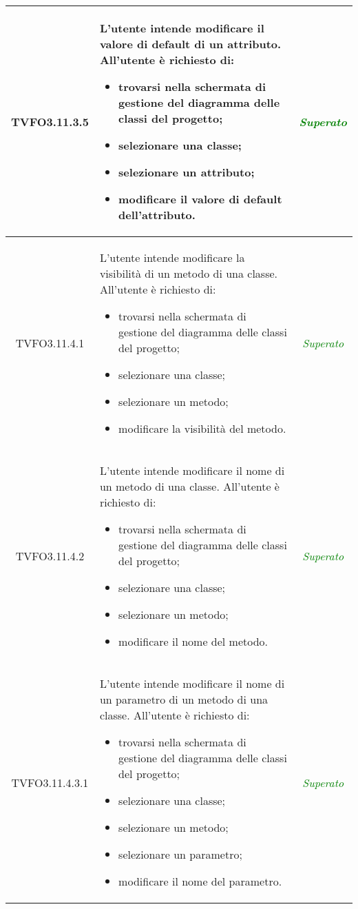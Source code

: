 \begin{longtable}{|c|>{}m{8cm}|c|}
\hypertarget{TVFO3.11.3.5}{TVFO3.11.3.5} & L'utente intende modificare il valore di default di un attributo.
All'utente è richiesto di:
\begin{itemize}
	\item trovarsi nella schermata di gestione del diagramma delle classi del progetto;
	\item selezionare una classe;
	\item selezionare un attributo;
	\item modificare il valore di default dell'attributo.
\end{itemize} & \textcolor{Green}{\textit{Superato}}\\ \hline

\hypertarget{TVFO3.11.4.1}{TVFO3.11.4.1} & L'utente intende modificare la visibilità di un metodo di una classe.
All'utente è richiesto di:
\begin{itemize}
	\item trovarsi nella schermata di gestione del diagramma delle classi del progetto;
	\item selezionare una classe;
	\item selezionare un metodo;
	\item modificare la visibilità del metodo.
\end{itemize} & \textcolor{Green}{\textit{Superato}}\\ \hline

\hypertarget{TVFO3.11.4.2}{TVFO3.11.4.2} & L'utente intende modificare il nome di un metodo di una classe.
All'utente è richiesto di:
\begin{itemize}
	\item trovarsi nella schermata di gestione del diagramma delle classi del progetto;
	\item selezionare una classe;
	\item selezionare un metodo;
	\item modificare il nome del metodo.
\end{itemize} & \textcolor{Green}{\textit{Superato}}\\ \hline

\hypertarget{TVFO3.11.4.3.1}{TVFO3.11.4.3.1} & L'utente intende modificare il nome di un parametro di un metodo di una classe.
All'utente è richiesto di:
\begin{itemize}
	\item trovarsi nella schermata di gestione del diagramma delle classi del progetto;
	\item selezionare una classe; 
	\item selezionare un metodo; 
	\item selezionare un parametro;
	\item modificare il nome del parametro.
\end{itemize} & \textcolor{Green}{\textit{Superato}}\\ \hline


\end{longtable}
